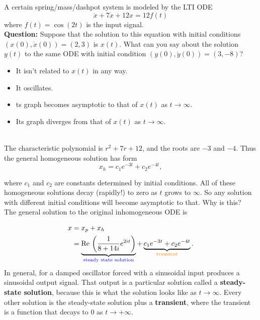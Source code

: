 A certain spring/mass/dashpot system is modeled by the LTI ODE
\begin{equation*}
  \ddot x + 7\dot x+12 x = 12f(t)
\end{equation*}
where $f(t)=\cos (2t)$ is the input signal.\\

\textbf{\color{blue}Question:} Suppose that the solution to this equation
with initial conditions $(x(0), \dot x(0)) = (2,3)$ is $x(t)$.
What can you say about the solution $y(t)$ to the same ODE with initial condition
$(y(0), \dot y(0)) = (3,-8)$?
\begin{itemize}
\item It isn't related to $x(t)$ in any way.
\item It oscillates.
\item ts graph becomes asymptotic to that of $x(t)$ as $t \to \infty$.
\item Its graph diverges from that of $x(t)$ as $t \to \infty$.
\end{itemize}

\Solution \\
The characteristic polynomial is $r^2 + 7r + 12$, and the roots are $-3$ and $-4$.
Thus the general homogeneous solution has form
\begin{equation*}
  x_ h = c_1 e^{-3t} + c_2 e^{-4t},
\end{equation*}

where $c_ 1$ and $c_ 2$ are constants determined by initial conditions.
All of these homogeneous solutions decay (rapidly!) to zero as $t$ grows to $\infty$.
So any solution with different initial conditions will become
asymptotic to that. Why is this?\\

The general solution to the original inhomogeneous ODE is

\begin{align*}
  \displaystyle  x \displaystyle &= x_ p + x_ h \\
  \displaystyle &=
                  \underbrace{\mathrm{Re\, }
                  \left( \frac{1}{8+14i} e^{2it} \right)}_{{\color{blue}{\text {steady state solution}}} }
                  + \underbrace{c_1 e^{-3t} + c_2 e^{-4t}}_{{\color{orange}{\text {transient}}} }.
\end{align*}
In general, for a damped oscillator forced with a sinusoidal input produces a sinusoidal output signal.
That output is a particular solution called a \textbf{\color{blue} steady-state solution},
because this is what the solution looks like as $t \to \infty$.
Every other solution is the steady-state solution plus a \textbf{\color{orange} transient},
where the transient is a function that decays to $0$ as $ t \to + \infty$. \\


